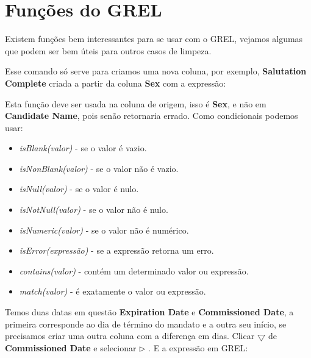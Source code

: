 \documentclass[a4paper,11pt]{article}
\begin{document}
\section{Funções do GREL}
Existem funções bem interessantes para se usar com o GREL, vejamos algumas que podem ser bem úteis para outros casos de limpeza.


Esse comando só serve para criamos uma nova coluna, por exemplo, \textbf{Salutation Complete} criada a partir da coluna \textbf{Sex} com a expressão: \\

Esta função deve ser usada na coluna de origem, isso é \textbf{Sex}, e não em \textbf{Candidate Name}, pois senão retornaria errado. Como condicionais podemos usar:
\begin{itemize}[nolistsep]
	\item \textit{isBlank(valor)} - se o valor é vazio.
	\item \textit{isNonBlank(valor)} - se o valor não é vazio.
	\item \textit{isNull(valor)} - se o valor é nulo.
	\item \textit{isNotNull(valor)} - se o valor não é nulo.
	\item \textit{isNumeric(valor)} - se o valor não é numérico.
	\item \textit{isError(expressão)} - se a expressão retorna um erro.
	\item \textit{contains(valor)} - contém um determinado valor ou expressão.
	\item \textit{match(valor)} - é exatamente o valor ou expressão.
\end{itemize}


Temos duas datas em questão \textbf{Expiration Date} e \textbf{Commissioned Date}, a primeira corresponde ao dia de término do mandato e a outra seu início, se precisamos criar uma outra coluna com a diferença em dias. Clicar $\bigtriangledown$ de \textbf{Commissioned Date} e selecionar  $\triangleright$ . E a expressão em GREL: \\
\end{document}
